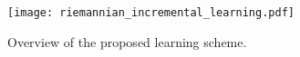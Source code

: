 \begin{figure}[t!]
	\centering
	\hspace*{\fill}
	\texttt{[image: riemannian\_incremental\_learning.pdf]} 
	\hspace*{\fill}
	\caption[] {Overview of the proposed learning scheme.}\label{fig:riemannian_incremental_learning}
\end{figure}
